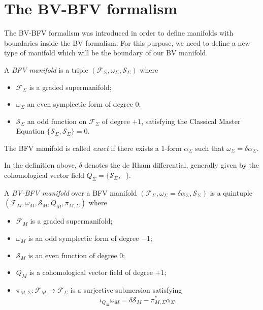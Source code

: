 \section{The BV-BFV formalism}
\label{sec:BF-BFV}

The BV-BFV formalism was introduced in order to define manifolds with boundaries inside the BV formalism.
For this purpose, we need to define a new type of manifold which will be the boundary of our BV manifold.

\begin{definition}
\label{def:BFV_manifold}
    A \emph{BFV manifold} is a triple $(\mathcal{F}_\Sigma, \omega_\Sigma, \mathcal{S}_\Sigma)$ where
    \begin{itemize}
        \item $\mathcal{F}_\Sigma$ is a graded supermanifold;
        \item $\omega_\Sigma$ an even symplectic form of degree $0$;
        \item $\mathcal{S}_\Sigma$ an odd function on $\mathcal{F}_\Sigma$ of degree $+1$, satisfying the Classical Master Equation $\{\mathcal{S}_\Sigma, \mathcal{S}_\Sigma\} = 0$.
    \end{itemize}
    The BFV manifold is called \emph{exact} if there exists a $1$-form $\alpha_\Sigma$ such that $\omega_\Sigma = \delta \alpha_\Sigma$.
\end{definition}

In the definition above, $\delta$ denotes the de Rham differential, generally given by the cohomological vector field $Q_\Sigma = \{\mathcal{S}_\Sigma, \;\;\}$.

\begin{definition}
\label{def:BV-BFV}
    A \emph{BV-BFV manifold} over a BFV manifold $(\mathcal{F}_\Sigma, \omega_\Sigma = \delta \alpha_\Sigma, \mathcal{S}_\Sigma)$ is a quintuple $(\mathcal{F}_M, \omega_M, \mathcal{S}_M, Q_M, \pi_{M, \Sigma})$ where
    \begin{itemize}
        \item $\mathcal{F}_M$ is a graded supermanifold;
        \item $\omega_M$ is an odd symplectic form of degree $-1$;
        \item $\mathcal{S}_M$ is an even function of degree $0$;
        \item $Q_M$ is a cohomological vector field of degree $+1$;
        \item $\pi_{M, \Sigma}: \mathcal{F}_M \rightarrow \mathcal{F}_\Sigma$ is a surjective submersion satisfying
        \begin{equation}
            \iota_{Q_M} \omega_M = \delta \mathcal{S}_M - \pi^*_{M,\Sigma} \alpha_\Sigma.
        \end{equation}
    \end{itemize}
\end{definition}

